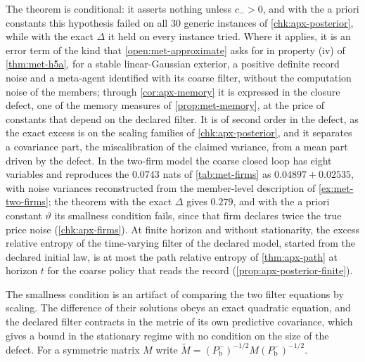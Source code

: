 The theorem is conditional: it asserts nothing unless $c_->0$, and with the a priori constants this hypothesis failed on all $30$ generic instances of \cref{chk:apx-posterior}, while with the exact $\Delta$ it held on every instance tried. Where it applies, it is an error term of the kind that \cref{open:met-approximate} asks for in property (iv) of \cref{thm:met-h5a}, for a stable linear-Gaussian exterior, a positive definite record noise and a meta-agent identified with its coarse filter, without the computation noise of the members; through \cref{cor:apx-memory} it is expressed in the closure defect, one of the memory measures of \cref{prop:met-memory}, at the price of constants that depend on the declared filter. It is of second order in the defect, as the exact excess is on the scaling families of \cref{chk:apx-posterior}, and it separates a covariance part, the miscalibration of the claimed variance, from a mean part driven by the defect. In the two-firm model the coarse closed loop has eight variables and reproduces the $0.0743$ nats of \cref{tab:met-firms} as $0.04897+0.02535$, with noise variances reconstructed from the member-level description of \cref{ex:met-two-firms}; the theorem with the exact $\Delta$ gives $0.279$, and with the a priori constant $\vartheta$ its smallness condition fails, since that firm declares twice the true price noise (\cref{chk:apx-firms}). At finite horizon and without stationarity, the excess relative entropy of the time-varying filter of the declared model, started from the declared initial law, is at most the path relative entropy of \cref{thm:apx-path} at horizon $t$ for the coarse policy that reads the record (\cref{prop:apx-posterior-finite}).

The smallness condition is an artifact of comparing the two filter equations by scaling. The difference of their solutions obeys an exact quadratic equation, and the declared filter contracts in the metric of its own predictive covariance, which gives a bound in the stationary regime with no condition on the size of the defect. For a symmetric matrix $M$ write $\tilde M=(P^-_{\mathrm b})^{-1/2}M(P^-_{\mathrm b})^{-1/2}$.

